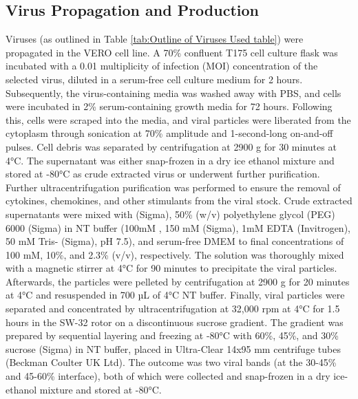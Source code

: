 \subsection{Virus Propagation and Production} \label{subsec:Virus Propagation and Production}
Viruses (as outlined in Table \ref{tab:Outline of Viruses Used table}) were propagated in the VERO cell line. A 70\% confluent T175 cell culture flask was incubated with a 0.01 multiplicity of infection (MOI) concentration of the selected virus, diluted in a serum-free cell culture medium for 2 hours. Subsequently, the virus-containing media was washed away with PBS, and cells were incubated in 2\% serum-containing growth media for 72 hours. Following this, cells were scraped into the media, and viral particles were liberated from the cytoplasm through sonication at 70\% amplitude and 1-second-long on-and-off pulses. Cell debris was separated by centrifugation at 2900 g for 30 minutes at 4°C. The supernatant was either snap-frozen in a dry ice ethanol mixture and stored at -80°C as crude extracted virus or underwent further purification. Further ultracentrifugation purification was performed to ensure the removal of cytokines, chemokines, and other stimulants from the viral stock. Crude extracted supernatants were mixed with  (Sigma), 50\% (w/v) polyethylene glycol (PEG) 6000 (Sigma) in NT buffer (100mM , 150 mM  (Sigma), 1mM EDTA (Invitrogen), 50 mM Tris- (Sigma), pH 7.5), and serum-free DMEM to final concentrations of 100 mM, 10\%, and 2.3\% (v/v), respectively. The solution was thoroughly mixed with a magnetic stirrer at 4°C for 90 minutes to precipitate the viral particles. Afterwards, the particles were pelleted by centrifugation at 2900 g for 20 minutes at 4°C and resuspended in 700 µL of 4°C NT buffer. Finally, viral particles were separated and concentrated by ultracentrifugation at 32,000 rpm at 4°C for 1.5 hours in the SW-32 rotor on a discontinuous sucrose gradient. The gradient was prepared by sequential layering and freezing at -80°C with 60\%, 45\%, and 30\% sucrose (Sigma) in NT buffer, placed in Ultra-Clear 14x95 mm centrifuge tubes (Beckman Coulter UK Ltd). The outcome was two viral bands (at the 30-45\% and 45-60\% interface), both of which were collected and snap-frozen in a dry ice-ethanol mixture and stored at -80°C.

